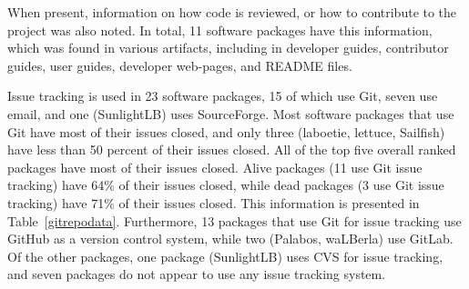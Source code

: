\documentclass[final, 3p, times, authoryear]{elsarticle}
\begin{document}
When present, information on how code is reviewed, or how to contribute to the
project was also noted. In total, 11 software packages have this information,
which was found in various artifacts, including in developer guides, contributor
guides, user guides, developer web-pages, and README files. 

Issue tracking is used in 23 software packages, 15 of which use Git, seven use
email, and one (SunlightLB) uses SourceForge. Most software packages that use
Git have most of their issues closed, and only three (laboetie, lettuce,
Sailfish) have less than 50 percent of their issues closed. All of the top five
overall ranked packages have most of their issues closed. Alive packages (11 use Git issue tracking) have 64\% of their issues closed, while dead packages (3 use Git issue tracking) have 71\% of their issues closed. This information is presented in Table~\ref{gitrepodata}. Furthermore, 13 packages that use Git for issue tracking use GitHub as a version control system, while two (Palabos, waLBerla) use GitLab. Of the other packages, one package (SunlightLB) uses CVS for issue tracking, and seven packages do not appear to use any issue tracking system.
\end{document}
